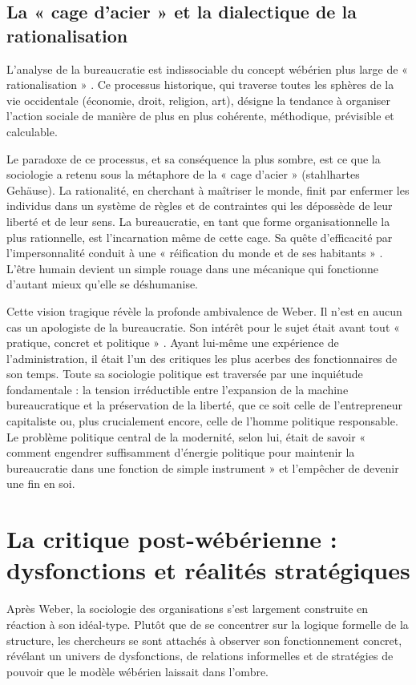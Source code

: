 \section{La « cage d'acier »  et la dialectique de la rationalisation}
L'analyse de la bureaucratie est indissociable du concept wébérien plus large de « rationalisation » . Ce processus historique, qui traverse toutes les sphères de la vie occidentale (économie, droit, religion, art), désigne la tendance à organiser l'action sociale de manière de plus en plus cohérente, méthodique, prévisible et calculable.

Le paradoxe de ce processus, et sa conséquence la plus sombre, est ce que la sociologie a retenu sous la métaphore de la « cage d'acier »  (stahlhartes Gehäuse). La rationalité, en cherchant à maîtriser le monde, finit par enfermer les individus dans un système de règles et de contraintes qui les dépossède de leur liberté et de leur sens. La bureaucratie, en tant que forme organisationnelle la plus rationnelle, est l'incarnation même de cette cage. Sa quête d'efficacité par l'impersonnalité conduit à une « réification du monde et de ses habitants » . L'être humain devient un simple rouage dans une mécanique qui fonctionne d'autant mieux qu'elle se déshumanise.

Cette vision tragique révèle la profonde ambivalence de Weber. Il n'est en aucun cas un apologiste de la bureaucratie. Son intérêt pour le sujet était avant tout « pratique, concret et politique » . Ayant lui-même une expérience de l'administration, il était l'un des critiques les plus acerbes des fonctionnaires de son temps. Toute sa sociologie politique est traversée par une inquiétude fondamentale : la tension irréductible entre l'expansion de la machine bureaucratique et la préservation de la liberté, que ce soit celle de l'entrepreneur capitaliste ou, plus crucialement encore, celle de l'homme politique responsable. Le problème politique central de la modernité, selon lui, était de savoir « comment engendrer suffisamment d'énergie politique pour maintenir la bureaucratie dans une fonction de simple instrument »  et l'empêcher de devenir une fin en soi.

\chapter{La critique post-wébérienne : dysfonctions et réalités stratégiques}

Après Weber, la sociologie des organisations s'est largement construite en réaction à son idéal-type. Plutôt que de se concentrer sur la logique formelle de la structure, les chercheurs se sont attachés à observer son fonctionnement concret, révélant un univers de dysfonctions, de relations informelles et de stratégies de pouvoir que le modèle wébérien laissait dans l'ombre.

